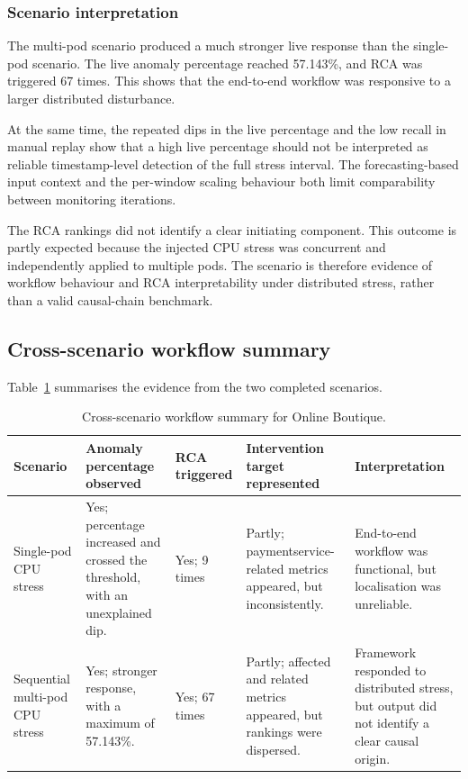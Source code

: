 \subsubsection{Scenario interpretation}
The multi-pod scenario produced a much stronger live response than the single-pod scenario. The live anomaly percentage reached 57.143\%, and RCA was triggered 67 times. This shows that the end-to-end workflow was responsive to a larger distributed disturbance.

At the same time, the repeated dips in the live percentage and the low recall in manual replay show that a high live percentage should not be interpreted as reliable timestamp-level detection of the full stress interval. The forecasting-based input context and the per-window scaling behaviour both limit comparability between monitoring iterations.

The RCA rankings did not identify a clear initiating component. This outcome is partly expected because the injected CPU stress was concurrent and independently applied to multiple pods. The scenario is therefore evidence of workflow behaviour and RCA interpretability under distributed stress, rather than a valid causal-chain benchmark.

\subsection{Cross-scenario workflow summary}
Table~\ref{tab:online_boutique_workflow_summary} summarises the evidence from the two completed scenarios.

\begin{table}[htbp]
    \centering
    \small
    \caption{Cross-scenario workflow summary for Online Boutique.}
    \label{tab:online_boutique_workflow_summary}
    \begin{tabular}{p{} p{} p{} p{} p{}}
        \toprule
        \textbf{Scenario} & \textbf{Anomaly percentage observed} & \textbf{RCA triggered} & \textbf{Intervention target represented} & \textbf{Interpretation} \\
        \midrule
        Single-pod CPU stress & Yes; percentage increased and crossed the threshold, with an unexplained dip. & Yes; 9 times & Partly; paymentservice-related metrics appeared, but inconsistently. & End-to-end workflow was functional, but localisation was unreliable. \\
        Sequential multi-pod CPU stress & Yes; stronger response, with a maximum of 57.143\%. & Yes; 67 times & Partly; affected and related metrics appeared, but rankings were dispersed. & Framework responded to distributed stress, but output did not identify a clear causal origin. \\
        \bottomrule
    \end{tabular}
\end{table}

